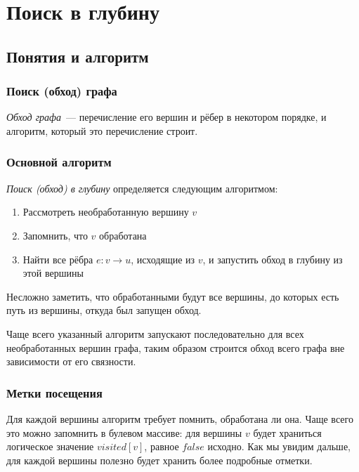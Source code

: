 \documentclass[a4paper,12pt]{article}
\begin{document}
  \section{Поиск в глубину}

    \subsection{Понятия и алгоритм}

      \subsubsection{Поиск (обход) графа}

      \emph{Обход графа}~--- перечисление его вершин и рёбер
      в некотором порядке, и алгоритм, который это перечисление
      строит.

      \subsubsection{Основной алгоритм}

      \emph{Поиск (обход) в глубину} определяется следующим
      алгоритмом:
      \begin{enumerate}
        \item Рассмотреть необработанную вершину $v$
        \item Запомнить, что $v$ обработана
        \item Найти все рёбра $e: v \to u$, исходящие из $v$,
          и запустить обход в глубину из этой вершины
      \end{enumerate}

      Несложно заметить, что обработанными будут все вершины,
      до которых есть путь из вершины, откуда был запущен обход.

      Чаще всего указанный алгоритм запускают последовательно
      для всех необработанных вершин графа, таким образом строится
      обход всего графа вне зависимости от его связности.

      \subsubsection{Метки посещения}

      Для каждой вершины алгоритм требует помнить, обработана ли она.
      Чаще всего это можно запомнить в булевом массиве: для
      вершины $v$ будет храниться логическое значение $visited[v]$,
      равное $false$ исходно. Как мы увидим дальше, для каждой вершины
      полезно будет хранить более подробные отметки.
\end{document}
